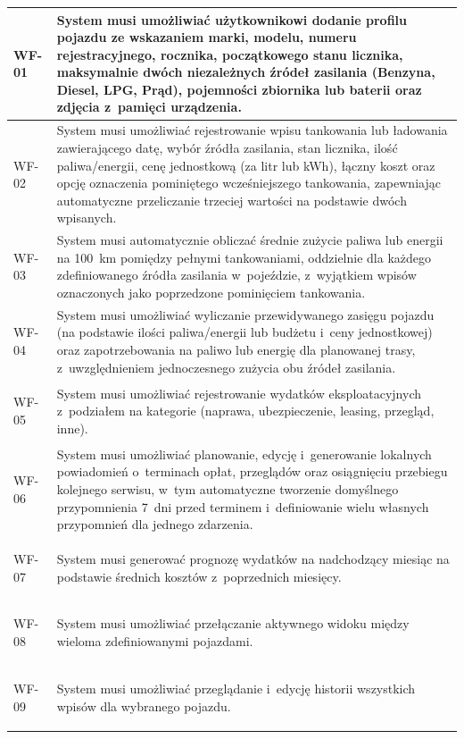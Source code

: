 \begin{longtable}{|>{\centering\arraybackslash}m{1.4cm}|m{\dimexpr\linewidth - 1.4cm - 4\tabcolsep - 3\arrayrulewidth\relax}|}
    \hypertarget{wf:WF-01}{WF-01} & System musi umożliwiać użytkownikowi dodanie profilu pojazdu ze wskazaniem marki, modelu, numeru rejestracyjnego, rocznika, początkowego stanu licznika, maksymalnie dwóch niezależnych źródeł zasilania (Benzyna, Diesel, LPG, Prąd), pojemności zbiornika lub baterii oraz zdjęcia z~pamięci urządzenia. \\
    \hline
    \hypertarget{wf:WF-02}{WF-02} & System musi umożliwiać rejestrowanie wpisu tankowania lub ładowania zawierającego datę, wybór źródła zasilania, stan licznika, ilość paliwa/energii, cenę jednostkową (za litr lub kWh), łączny koszt oraz opcję oznaczenia pominiętego wcześniejszego tankowania, zapewniając automatyczne przeliczanie trzeciej wartości na podstawie dwóch wpisanych. \\
    \hline
    \hypertarget{wf:WF-03}{WF-03} & System musi automatycznie obliczać średnie zużycie paliwa lub energii na 100~km pomiędzy pełnymi tankowaniami, oddzielnie dla każdego zdefiniowanego źródła zasilania w~pojeździe, z~wyjątkiem wpisów oznaczonych jako poprzedzone pominięciem tankowania. \\
    \hline
    \hypertarget{wf:WF-04}{WF-04} & System musi umożliwiać wyliczanie przewidywanego zasięgu pojazdu (na podstawie ilości paliwa/energii lub budżetu i~ceny jednostkowej) oraz zapotrzebowania na paliwo lub energię dla planowanej trasy, z~uwzględnieniem jednoczesnego zużycia obu źródeł zasilania. \\
    \hline
    \hypertarget{wf:WF-05}{WF-05} & System musi umożliwiać rejestrowanie wydatków eksploatacyjnych z~podziałem na kategorie (naprawa, ubezpieczenie, leasing, przegląd, inne). \\
    \hline
    \hypertarget{wf:WF-06}{WF-06} & System musi umożliwiać planowanie, edycję i~generowanie lokalnych powiadomień o~terminach opłat, przeglądów oraz osiągnięciu przebiegu kolejnego serwisu, w~tym automatyczne tworzenie domyślnego przypomnienia 7~dni przed terminem i~definiowanie wielu własnych przypomnień dla jednego zdarzenia. \\
    \hline
    \hypertarget{wf:WF-07}{WF-07} & System musi generować prognozę wydatków na nadchodzący miesiąc na podstawie średnich kosztów z~poprzednich miesięcy. \\
    \hline
    \hypertarget{wf:WF-08}{WF-08} & System musi umożliwiać przełączanie aktywnego widoku między wieloma zdefiniowanymi pojazdami. \\
    \hline
    \hypertarget{wf:WF-09}{WF-09} & System musi umożliwiać przeglądanie i~edycję historii wszystkich wpisów dla wybranego pojazdu. \\

\end{longtable}
